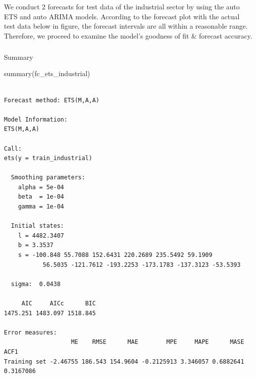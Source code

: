 \documentclass[
  letterpaper,
  DIV=11,
  numbers=noendperiod]{scrartcl}
\makeatletter
\let\oldsubparagraph\subparagraph
\renewcommand{\subparagraph}{
    \@ifstar
      \xxxSubParagraphStar
      \xxxSubParagraphNoStar
  }
\newcommand{\xxxSubParagraphStar}[1]{\oldsubparagraph*{#1}\mbox{}}
\newcommand{\xxxSubParagraphNoStar}[1]{\oldsubparagraph{#1}\mbox{}}
\newenvironment{Shaded}{\begin{snugshade}}{\end{snugshade}}
\newcommand{\FunctionTok}[1]{\textcolor[rgb]{0.28,0.35,0.67}{#1}}
\newcommand{\NormalTok}[1]{\textcolor[rgb]{0.00,0.23,0.31}{#1}}
\makeatother
\begin{document}
We conduct 2 forecasts for test data of the industrial sector by using
the auto ETS and auto ARIMA models. According to the forecast plot with
the actual test data below in figure, the forecast intervals are all
within a reasonable range. Therefore, we proceed to examine the model's
goodness of fit \& forecast accuracy.

\subparagraph{Summary}\label{summary-1}

\begin{Shaded}
\begin{Highlighting}[]
\FunctionTok{summary}\NormalTok{(fc\_ets\_industrial)}
\end{Highlighting}
\end{Shaded}

\begin{verbatim}

Forecast method: ETS(M,A,A)

Model Information:
ETS(M,A,A) 

Call:
ets(y = train_industrial)

  Smoothing parameters:
    alpha = 5e-04 
    beta  = 1e-04 
    gamma = 1e-04 

  Initial states:
    l = 4482.3407 
    b = 3.3537 
    s = -100.848 55.7088 152.6431 220.2689 235.5492 59.1909
           56.5035 -121.7612 -193.2253 -173.1783 -137.3123 -53.5393

  sigma:  0.0438

     AIC     AICc      BIC 
1475.251 1483.097 1518.845 

Error measures:
                   ME    RMSE      MAE        MPE     MAPE      MASE      ACF1
Training set -2.46755 186.543 154.9604 -0.2125913 3.346057 0.6882641 0.3167086


\end{verbatim}
\end{document}
